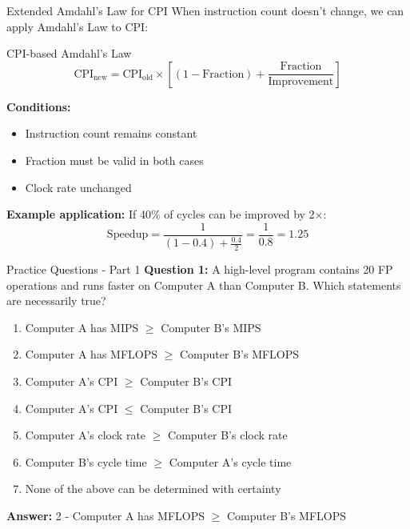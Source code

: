 \documentclass[aspectratio=169,12pt]{beamer}
\begin{document}
\begin{frame}{Extended Amdahl's Law for CPI}
When instruction count doesn't change, we can apply Amdahl's Law to CPI:

\begin{block}{CPI-based Amdahl's Law}
$$\text{CPI}_{\text{new}} = \text{CPI}_{\text{old}} \times \left[(1 - \text{Fraction}) + \frac{\text{Fraction}}{\text{Improvement}}\right]$$
\end{block}

\textbf{Conditions:}
\begin{itemize}
    \item Instruction count remains constant
    \item Fraction must be valid in both cases
    \item Clock rate unchanged
\end{itemize}

\textbf{Example application:}
If 40\% of cycles can be improved by 2×:
$$\text{Speedup} = \frac{1}{(1 - 0.4) + \frac{0.4}{2}} = \frac{1}{0.8} = 1.25$$
\end{frame}

\begin{frame}{Practice Questions - Part 1}
\textbf{Question 1:} A high-level program contains 20 FP operations and runs faster on Computer A than Computer B. Which statements are necessarily true?

\begin{enumerate}
    \item Computer A has MIPS $\geq$ Computer B's MIPS
    \item Computer A has MFLOPS $\geq$ Computer B's MFLOPS
    \item Computer A's CPI $\geq$ Computer B's CPI
    \item Computer A's CPI $\leq$ Computer B's CPI
    \item Computer A's clock rate $\geq$ Computer B's clock rate
    \item Computer B's cycle time $\geq$ Computer A's cycle time
    \item None of the above can be determined with certainty
\end{enumerate}

\pause
\textbf{Answer:} 2 - Computer A has MFLOPS $\geq$ Computer B's MFLOPS
\end{frame}
\end{document}
